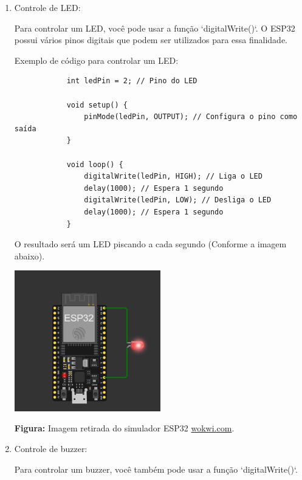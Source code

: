 \documentclass[a4paper]{article}
\begin{document}
    \begin{answer}
        \begin{enumerate}
            \item Controle de LED:

                Para controlar um LED, você pode usar a função `digitalWrite()`. O ESP32 possui vários pinos digitais que podem ser utilizados para essa finalidade.

                Exemplo de código para controlar um LED:

            \begin{verbatim}
            int ledPin = 2; // Pino do LED

            void setup() {
                pinMode(ledPin, OUTPUT); // Configura o pino como saída
            }

            void loop() {
                digitalWrite(ledPin, HIGH); // Liga o LED
                delay(1000); // Espera 1 segundo
                digitalWrite(ledPin, LOW); // Desliga o LED
                delay(1000); // Espera 1 segundo
            }
            \end{verbatim}
            O resultado será um LED piscando a cada segundo (Conforme a imagem abaixo).
            \begin{center}
                \includegraphics[width=0.5\textwidth]{images/led.png}
            \end{center}
            \begin{center}
                \small
                \textbf{Figura:} Imagem retirada do simulador ESP32 \href{https://wokwi.com}{wokwi.com}.
            \end{center}

            \item Controle de buzzer:

                Para controlar um buzzer, você também pode usar a função `digitalWrite()`.


\end{enumerate}
\end{answer}
\end{document}
